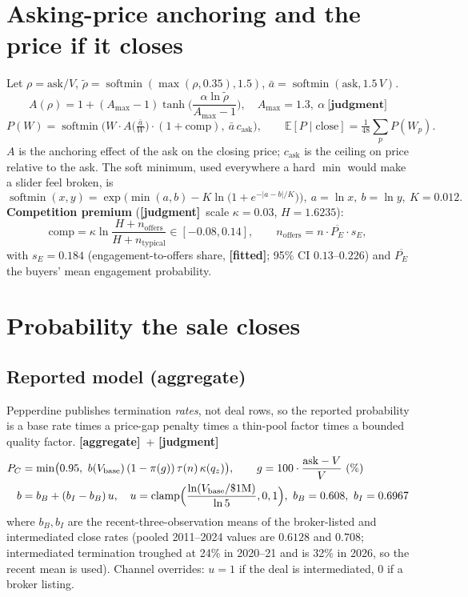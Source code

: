 \documentclass[11pt]{article}
\DeclareMathOperator{\softmin}{softmin}
\DeclareMathOperator{\clamp}{clamp}
\newcommand{\EV}[1]{\mathbb{E}\!\left[#1\right]}
\newcommand{\fit}{\textbf{[fitted]}}
\newcommand{\agg}{\textbf{[aggregate]}}
\newcommand{\jud}{\textbf{[judgment]}}
\begin{document}
\section{Asking-price anchoring and the price if it closes}
Let $\rho=\text{ask}/V$, $\tilde\rho=\softmin(\max(\rho,0.35),1.5)$, $\bar a=\softmin(\text{ask},1.5\,V)$.
\begin{equation}
A(\rho)=1+(A_{\max}-1)\tanh\!\Big(\frac{\alpha\ln\tilde\rho}{A_{\max}-1}\Big),\quad A_{\max}=1.3,\ \alpha\ \jud
\end{equation}
\begin{equation}
P(W)=\softmin\!\Big(W\cdot A\!\big(\tfrac{\bar a}{W}\big)\cdot(1+\text{comp}),\ \bar a\,c_{\text{ask}}\Big),\qquad
\EV{P\mid\text{close}}=\tfrac{1}{48}\sum_{p}P(W_p).
\end{equation}
$A$ is the anchoring effect of the ask on the closing price; $c_{\text{ask}}$ is the ceiling on price relative to the ask. The soft minimum, used everywhere a hard $\min$ would make a slider feel broken, is
\begin{equation}
\softmin(x,y)=\exp\!\Big(\min(a,b)-K\ln\!\big(1+e^{-|a-b|/K}\big)\Big),\ a=\ln x,\ b=\ln y,\ K=0.012.
\end{equation}
\textbf{Competition premium} (\jud\ scale $\kappa=0.03$, $H=1.6235$):
\begin{equation}
\text{comp}=\kappa\ln\frac{H+n_{\text{offers}}}{H+n_{\text{typical}}}\in[-0.08,0.14],\qquad n_{\text{offers}}=n\cdot\overline{P_E}\cdot s_E,
\end{equation}
with $s_E=0.184$ (engagement-to-offers share, \fit; 95\% CI $0.13$--$0.226$) and $\overline{P_E}$ the buyers' mean engagement probability.

\section{Probability the sale closes}
\subsection{Reported model (aggregate)}
Pepperdine publishes termination \emph{rates}, not deal rows, so the reported probability is a base rate times a price-gap penalty times a thin-pool factor times a bounded quality factor. \agg\ + \jud
\begin{align}
P_C&=\min\!\big(0.95,\ b(V_{\text{base}})\,(1-\pi(g))\,\tau(n)\,\kappa(q_z)\big),\qquad g=100\cdot\frac{\text{ask}-V}{V}\ (\%)\\
b&=b_B+(b_I-b_B)\,u,\quad u=\clamp\!\Big(\frac{\ln(V_{\text{base}}/\$1\text{M})}{\ln 5},0,1\Big),\ b_B=0.608,\ b_I=0.6967\notag
\end{align}
where $b_B,b_I$ are the recent-three-observation means of the broker-listed and intermediated close rates (pooled 2011--2024 values are $0.6128$ and $0.708$; intermediated termination troughed at 24\% in 2020--21 and is 32\% in 2026, so the recent mean is used). Channel overrides: $u=1$ if the deal is intermediated, $0$ if a broker listing.
\end{document}
